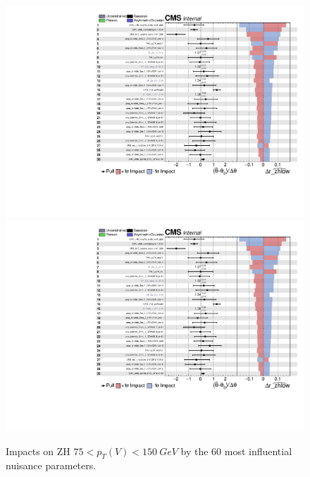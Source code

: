 \begin{figure}
  \centering
  \includegraphics[width=0.85\linewidth,page=1]{figures/impacts/impacts_r_zhlow.pdf}
  \includegraphics[width=0.85\linewidth,page=2]{figures/impacts/impacts_r_zhlow.pdf}
  \caption[Impacts for ZH $75 < p_T(V) < \SI{150}{GeV}$]{
    Impacts on ZH $75 < p_T(V) < \SI{150}{GeV}$
    by the 60 most influential nuisance parameters.
  }
  \label{fig:impacts_r_zhlow}
\end{figure}

